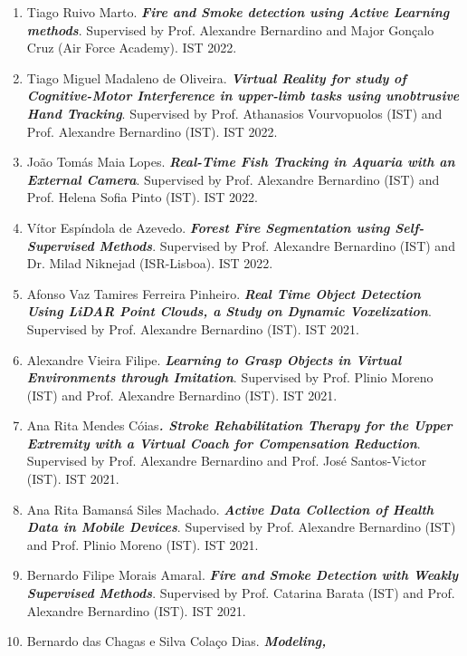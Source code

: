 \documentclass[
]{article}
\begin{document}
\begin{enumerate}
{{  to Wildfire Aerial Thermal Image Segmentation Using Unsupervised
  Methods}}. Supervised by Prof. Alexandre Bernardino (IST) and Prof.
  Ricardo Ribeiro (IST). IST 2022.
\item
  Tiago Ruivo Marto. \emph{\textbf{Fire and Smoke detection using Active
  Learning methods}}. Supervised by Prof. Alexandre Bernardino and Major
  Gonçalo Cruz (Air Force Academy). IST 2022.
\item
  Tiago Miguel Madaleno de Oliveira. \emph{\textbf{Virtual Reality for
  study of Cognitive-Motor Interference in upper-limb tasks using
  unobtrusive Hand Tracking}}. Supervised by Prof. Athanasios
  Vourvopuolos (IST) and Prof. Alexandre Bernardino (IST). IST 2022.
\item
  João Tomás Maia Lopes. \emph{\textbf{Real-Time Fish Tracking in
  Aquaria with an External Camera}}. Supervised by Prof. Alexandre
  Bernardino (IST) and Prof. Helena Sofia Pinto (IST). IST 2022.
\item
  Vítor Espíndola de Azevedo. \emph{\textbf{Forest Fire Segmentation
  using Self-Supervised Methods}}. Supervised by Prof. Alexandre
  Bernardino (IST) and Dr. Milad Niknejad (ISR-Lisboa). IST 2022.
\item
  Afonso Vaz Tamires Ferreira Pinheiro. \emph{\textbf{Real Time Object
  Detection Using LiDAR Point Clouds, a Study on Dynamic Voxelization}}.
  Supervised by Prof. Alexandre Bernardino (IST). IST 2021.
\item
  Alexandre Vieira Filipe. \emph{\textbf{Learning to Grasp Objects in
  Virtual Environments through Imitation}}. Supervised by Prof. Plinio
  Moreno (IST) and Prof. Alexandre Bernardino (IST). IST 2021.
\item
  Ana Rita Mendes Cóias\emph{\textbf{. Stroke Rehabilitation Therapy for
  the Upper Extremity with a Virtual Coach for Compensation Reduction}}.
  Supervised by Prof. Alexandre Bernardino and Prof. José Santos-Victor
  (IST). IST 2021.
\item
  Ana Rita Bamansá Siles Machado. \emph{\textbf{Active Data Collection
  of Health Data in Mobile Devices}}. Supervised by Prof. Alexandre
  Bernardino (IST) and Prof. Plinio Moreno (IST). IST 2021.
\item
  Bernardo Filipe Morais Amaral. \emph{\textbf{Fire and Smoke Detection
  with Weakly Supervised Methods}}. Supervised by Prof. Catarina Barata
  (IST) and Prof. Alexandre Bernardino (IST). IST 2021.
\item
  Bernardo das Chagas e Silva Colaço Dias. \emph{\textbf{Modeling,
}}
\end{enumerate}
\end{document}
